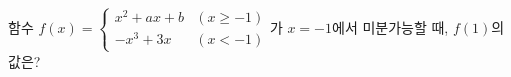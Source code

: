 함수 $f(x)=\begin{cases} x^2+ax+b & (x\ge -1) \\ -x^3+3x & (x<-1) \end{cases}$가 $x=-1$에서 미분가능할 때, $f(1)$의 값은? 
